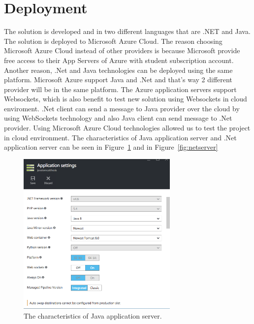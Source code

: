 
\section{Deployment}
\label{section:deployment}

The solution is developed and in two different languages that are .NET and Java. The solution is deployed to Microsoft Azure Cloud. The reason choosing Microsoft Azure Cloud instead of other providers is because Microsoft provide free access to their App Servers of Azure with student subscription account. Another reason, .Net and Java technologies can be deployed using the same platform. Microsoft Azure support Java and .Net and that's way  2 different provider will be in the same platform. The Azure application servers support Websockets, which is also benefit to test new solution using Websockets in cloud enviroment. .Net client can send a message to Java provider over the cloud by using WebSockets technology and also Java client can send message to .Net provider. Using Microsoft Azure Cloud technologies allowed us to test the project in cloud environment. The characteristics of Java application server and .Net application server can be seen in Figure~\ref{fig:javaserver} and in Figure~\ref{fig:netserver}

\begin{figure}[!htb]
  \centering
  \includegraphics[width=0.7\textwidth]{Figures/javaserver.png}
  \caption[The characteristics of Java application server.]{The characteristics of Java application server.}
  \label{fig:javaserver}
\end{figure}

